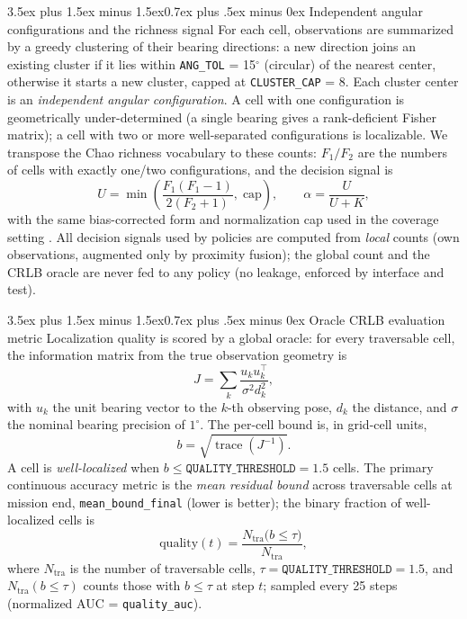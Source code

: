 \documentclass[journal]{IEEEtran}
\makeatletter
\renewcommand{\subsection}{\@startsection{subsection}{2}{\z@}%
{3.5ex plus 1.5ex minus 1.5ex}{0.7ex plus .5ex minus 0ex}%
{\normalfont\normalsize\bfseries}}
\makeatother
\begin{document}
\subsection{Independent angular configurations and the richness signal}
For each cell, observations are summarized by a greedy clustering of their
bearing directions: a new direction joins an existing cluster if it lies
within \texttt{ANG\_TOL} = 15$^\circ$ (circular) of the nearest center,
otherwise it starts a new cluster, capped at \texttt{CLUSTER\_CAP} = 8. Each
cluster center is an \emph{independent angular configuration}. A cell with one
configuration is geometrically under-determined (a single bearing gives a
rank-deficient Fisher matrix); a cell with two or more well-separated
configurations is localizable. We transpose the Chao richness vocabulary to
these counts: $F_1/F_2$ are the numbers of cells with exactly one/two
configurations, and the decision signal is
\begin{equation}
U = \min\!\left( \frac{F_1 (F_1 - 1)}{2 (F_2 + 1)},\; \text{cap} \right),
\qquad \alpha = \frac{U}{U + K},
\end{equation}
with the same bias-corrected form and normalization cap used in the coverage
setting \cite{Chao1984}. All decision signals used by policies are computed
from \emph{local} counts (own observations, augmented only by proximity
fusion); the global count and the CRLB oracle are never fed to any policy (no
leakage, enforced by interface and test).

\subsection{Oracle CRLB evaluation metric}
Localization quality is scored by a global oracle: for every traversable cell,
the information matrix from the true observation geometry is
\begin{equation}
J = \sum_k \frac{u_k u_k^{\top}}{\sigma^2 d_k^2},
\end{equation}
with $u_k$ the unit bearing vector to the $k$-th observing pose, $d_k$ the
distance, and $\sigma$ the nominal bearing precision of $1^\circ$. The per-cell
bound is, in grid-cell units,
\begin{equation}
b = \sqrt{\operatorname{trace}(J^{-1})}.
\label{eq:crlb_bound}
\end{equation}
A cell is \emph{well-localized} when $b \le \texttt{QUALITY\_THRESHOLD} = 1.5$
cells. The primary continuous accuracy metric is the \emph{mean residual bound}
across traversable cells at mission end, \texttt{mean\_bound\_final} (lower is
better); the binary fraction of well-localized cells is
\begin{equation}
\mathrm{quality}(t) = \frac{N_{\text{tra}}\bigl(b \le \tau\bigr)}{N_{\text{tra}}},
\end{equation}
where $N_{\text{tra}}$ is the number of traversable cells, $\tau =
\texttt{QUALITY\_THRESHOLD} = 1.5$, and $N_{\text{tra}}(b \le \tau)$ counts
those with $b \le \tau$ at step $t$; sampled every 25 steps (normalized AUC =
\texttt{quality\_auc}).
\end{document}
